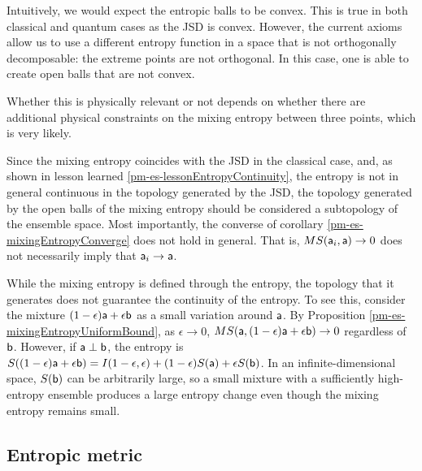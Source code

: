 \begin{mathSection}
\begin{remark}
	Intuitively, we would expect the entropic balls to be convex. This is true in both classical and quantum cases as the JSD is convex. However, the current axioms allow us to use a different entropy function in a space that is not orthogonally decomposable: the extreme points are not orthogonal. In this case, one is able to create open balls that are not convex.
	
	Whether this is physically relevant or not depends on whether there are additional physical constraints on the mixing entropy between three points, which is very likely.
\end{remark}

\begin{remark}
	Since the mixing entropy coincides with the JSD in the classical case, and, as shown in lesson learned \ref{pm-es-lessonEntropyContinuity}, the entropy is not in general continuous in the topology generated by the JSD, the topology generated by the open balls of the mixing entropy should be considered a subtopology of the ensemble space. Most importantly, the converse of corollary \ref{pm-es-mixingEntropyConverge} does not hold in general. That is, $MS(\ens[a]_i, \ens[a]) \to 0$ does not necessarily imply that $\ens[a]_i \to \ens[a]$. 
\end{remark}
\end{mathSection}

While the mixing entropy is defined through the entropy, the topology that it generates does not guarantee the continuity of the entropy. To see this, consider the mixture $(1-\epsilon)\ens[a] + \epsilon \ens[b]$ as a small variation around $\ens[a]$. By Proposition \ref{pm-es-mixingEntropyUniformBound}, as $\epsilon \to 0$, $MS(\ens[a], (1-\epsilon)\ens[a] + \epsilon\ens[b]) \to 0$ regardless of $\ens[b]$. However, if $\ens[a] \ortho \ens[b]$, the entropy is $S((1-\epsilon)\ens[a] + \epsilon\ens[b]) = I(1-\epsilon, \epsilon) + (1-\epsilon)S(\ens[a]) + \epsilon S(\ens[b])$. In an infinite-dimensional space, $S(\ens[b])$ can be arbitrarily large, so a small mixture with a sufficiently high-entropy ensemble produces a large entropy change even though the mixing entropy remains small.

\subsection{Entropic metric}

